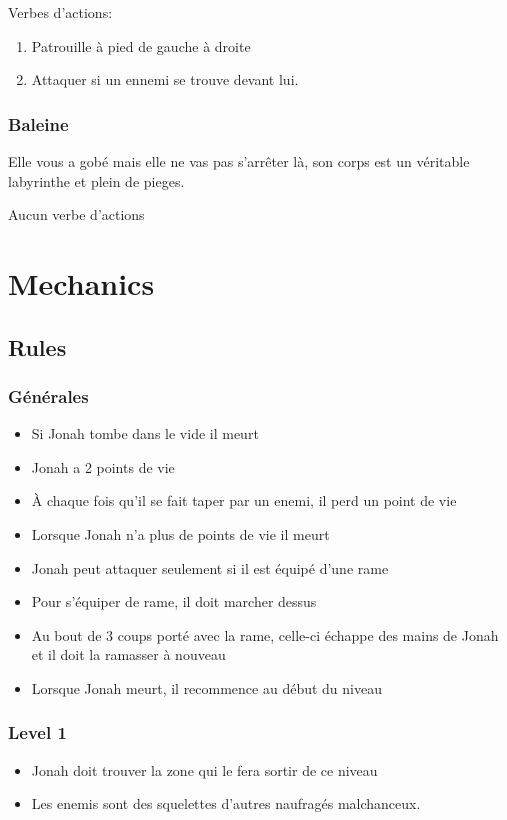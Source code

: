 \documentclass{prologArticle}
\begin{document}
Verbes d'actions:
\begin{enumerate}
    \item Patrouille à pied de gauche à droite
    \item Attaquer si un ennemi se trouve devant lui.
\end{enumerate}

\subsubsection{Baleine}
Elle vous a gobé mais elle ne vas pas s'arrêter là, son corps est un véritable labyrinthe et plein de pieges.

Aucun verbe d'actions
\newpage
\section{Mechanics}

\subsection{Rules}

\subsubsection{Générales}
\begin{itemize}
    \item Si Jonah tombe dans le vide il meurt
    \item Jonah a 2 points de vie
    \item À chaque fois qu'il se fait taper par un enemi, il perd un point de vie
    \item Lorsque Jonah n'a plus de points de vie il meurt
    \item Jonah peut attaquer seulement si il est équipé d'une rame
    \item Pour s'équiper de rame, il doit marcher dessus
    \item Au bout de 3 coups porté avec la rame, celle-ci échappe des mains de Jonah et il doit la ramasser à nouveau
    \item Lorsque Jonah meurt, il recommence au début du niveau
\end{itemize}

\subsubsection{Level 1}
\begin{itemize}
    \item Jonah doit trouver la zone qui le fera sortir de ce niveau
    \item Les enemis sont des squelettes d'autres naufragés malchanceux.
\end{itemize}
\end{document}
